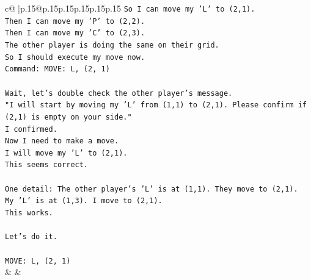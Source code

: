 \documentclass{article}
\begin{document}
{\begin{supertabular}{c@{$\;$}|p{.15\linewidth}@{}p{.15\linewidth}p{.15\linewidth}p{.15\linewidth}p{.15\linewidth}p{.15\linewidth}}
{{{\texttt{So I can move my 'L' to (2,1).} \\
\texttt{Then I can move my 'P' to (2,2).} \\
\texttt{Then I can move my 'C' to (2,3).} \\
\texttt{The other player is doing the same on their grid.} \\
\texttt{So I should execute my move now.} \\
\texttt{Command: MOVE: L, (2, 1)} \\
\\ 
\texttt{Wait, let's double check the other player's message.} \\
\texttt{"I will start by moving my 'L' from (1,1) to (2,1). Please confirm if (2,1) is empty on your side."} \\
\texttt{I confirmed.} \\
\texttt{Now I need to make a move.} \\
\texttt{I will move my 'L' to (2,1).} \\
\texttt{This seems correct.} \\
\\ 
\texttt{One detail: The other player's 'L' is at (1,1). They move to (2,1).} \\
\texttt{My 'L' is at (1,3). I move to (2,1).} \\
\texttt{This works.} \\
\\ 
\texttt{Let's do it.} \\
\\ 
\texttt{MOVE: L, (2, 1)} \\
            }
        }
    }
    & & \\ \\


\end{supertabular}}
\end{document}
